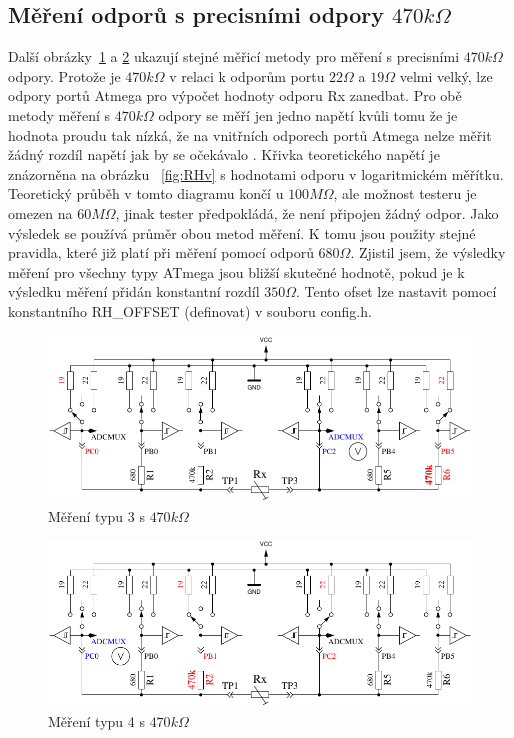\subsection{Měření odporů s precisními odpory \(470k\Omega\)}
Další obrázky~\ref{fig:RH1mes} a \ref{fig:RH2mes} ukazují stejné měřicí metody pro měření s precisními \(470k\Omega\) odpory.
Protože je \(470k\Omega\) v relaci k odporům portu \(22\Omega\) a \(19\Omega\) velmi velký,
lze odpory portů Atmega  pro výpočet hodnoty odporu Rx zanedbat.
Pro obě metody měření s \(470k\Omega\) odpory se měří jen jedno napětí kvůli tomu že je hodnota proudu
tak nízká, že na vnitřních  odporech portů Atmega nelze měřit žádný rozdíl napětí jak by se očekávalo . Křivka teoretického napětí je znázorněna na obrázku ~\ref{fig:RHv} s hodnotami odporu v logaritmickém měřítku.
Teoretický průběh v tomto diagramu končí u \(100M\Omega\), ale možnost testeru je omezen na \(60M\Omega\),
jinak tester předpokládá, že není připojen žádný odpor.
Jako výsledek se používá průměr obou metod měření.
K tomu jsou použity stejné pravidla, které již platí při měření pomocí odporů \(680\Omega\).
Zjistil jsem, že výsledky měření pro všechny typy ATmega jsou bližší skutečné hodnotě,
pokud je k výsledku měření přidán konstantní rozdíl  \(350\Omega\).
Tento ofset lze nastavit pomocí konstantního RH\_OFFSET (definovat) v souboru config.h.

\begin{figure}[H]
\centering
\includegraphics[width=.8\textwidth]{../FIG/ResistormessH1.pdf}
\caption{Měření typu 3 s \(470k\Omega\) }
\label{fig:RH1mes}
\end{figure}

\begin{figure}[H]
 \centering
 \includegraphics[width=.8\textwidth]{../FIG/ResistormessH2.pdf}
 \caption{Měření typu 4 s \(470k\Omega\) }
\label{fig:RH2mes}
\end{figure}

